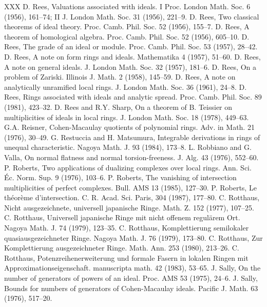 \begin{thebibliography}{XXX}
 D. Rees, Valuations associated with ideals. I Proc. London Math. Soc. 6 (1956), 161--74; II J. London Math. Soc. 31 (1956), 221--9.
 D. Rees, Two classical theorems of ideal theory. Proc. Camb. Phil. Soc. 52 (1956), 155--7.
 D. Rees, A theorem of homological algebra. Proc. Camb. Phil. Soc. 52 (1956), 605--10.
 D. Rees, The grade of an ideal or module. Proc. Camb. Phil. Soc. 53 (1957), 28--42.
 D. Rees, A note on form rings and ideals. Mathematika 4 (1957), 51--60.
 D. Rees, A note on general ideals. J. London Math. Soc. 32 (1957), 181--6.
 D. Rees, On a problem of Zariski. Illinois J. Math. 2 (1958), 145--59.
 D. Rees, A note on analytically unramified local rings. J. London Math. Soc. 36 (1961), 24--8.
 D. Rees, Rings associated with ideals and analytic spread. Proc. Camb. Phil. Soc. 89 (1981), 423--32.
 D. Rees and R.Y. Sharp, On a theorem of B. Teissier on multiplicities of ideals in local rings. J. London Math. Soc. 18 (1978), 449--63.
 G.A. Reisner, Cohen-Macaulay quotients of polynomial rings. Adv. in Math. 21 (1976), 30--49.
 G. Restuccia and H. Matsumura, Integrable derivations in rings of unequal characteristic. Nagoya Math. J. 93 (1984), 173--8.
 L. Robbiano and G. Valla, On normal flatness and normal torsion-freeness. J. Alg. 43 (1976), 552--60.
 P. Roberts, Two applications of dualizing complexes over local rings. Ann. Sci. \'Ec. Norm. Sup. 9 (1976), 103--6.
 P. Roberts, The vanishing of intersection multiplicities of perfect complexes. Bull. AMS 13 (1985), 127--30.
 P. Roberts, Le th\'eor\`eme d'intersection. C. R. Acad. Sci. Paris, 304 (1987), 177--80.
 C. Rotthaus, Nicht ausgezeichnete, universell japanische Ringe. Math. Z. 152 (1977), 107--25.
 C. Rotthaus, Universell japanische Ringe mit nicht offenem regul\"arem Ort. Nagoya Math. J. 74 (1979), 123--35.
 C. Rotthaus, Komplettierung semilokaler quasiausgezeichneter Ringe. Nagoya Math. J. 76 (1979), 173--80.
 C. Rotthaus, Zur Komplettierung ausgezeichneter Ringe. Math. Ann. 253 (1980), 213--26.
 C. Rotthaus, Potenzreihenerweiterung und formale Fasern in lokalen Ringen mit Approximationseigenschaft. manuscripta math. 42 (1983), 53--65.
 J. Sally, On the number of generators of powers of an ideal. Proc. AMS 53 (1975), 24--6.
 J. Sally, Bounds for numbers of generators of Cohen-Macaulay ideals. Pacific J. Math. 63 (1976), 517--20.

\end{thebibliography}
